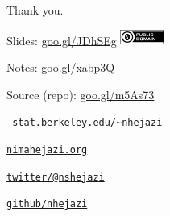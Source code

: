 \documentclass[12pt,t]{beamer}
\begin{document}
\begin{frame}[c]{Thank you.}

\Large
Slides: \href{https://goo.gl/JDhSEg}{goo.gl/JDhSEg} \quad
\includegraphics[height=5mm]{Figs/cc-zero.png}

\vspace{3mm}
Notes: \href{https://goo.gl/xabp3Q}{goo.gl/xabp3Q}

\vspace{3mm}
Source (repo): \href{https://goo.gl/m5As73}{goo.gl/m5As73}

\vspace{3mm}
\href{https://www.stat.berkeley.edu/~nhejazi}{\tt
  stat.berkeley.edu/\textasciitilde{}nhejazi}

\vspace{3mm}
\href{http://nimahejazi.org}{\tt nimahejazi.org}

\vspace{3mm}
\href{https://twitter.com/nshejazi}{\tt twitter/@nshejazi}

\vspace{3mm}
\href{https://github.com/nhejazi}{\tt github/nhejazi}


\end{frame}

\end{document}
